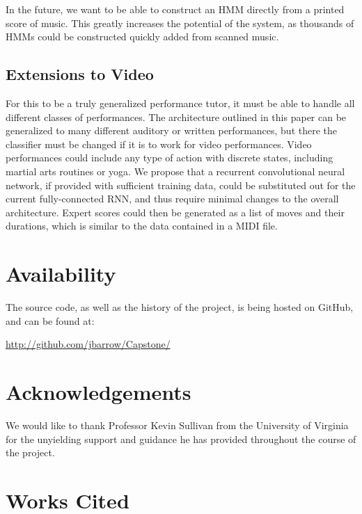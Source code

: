 \documentclass[twocolumn]{article}
\begin{document}
In the future, we want to be able to construct an HMM directly from a printed score of music. This greatly increases the potential of the system, as thousands of HMMs could be constructed quickly added from scanned music. 

\subsection{Extensions to Video}

For this to be a truly generalized performance tutor, it must be able to handle all different classes of performances. The architecture outlined in this paper can be generalized to many different auditory or written performances, but there the classifier must be changed if it is to work for video performances. Video performances could include any type of action with discrete states, including martial arts routines or yoga. We propose that a recurrent convolutional neural network, if provided with sufficient training data, could be substituted out for the current fully-connected RNN, and thus require minimal changes to the overall architecture. Expert scores could then be generated as a list of moves and their durations, which is similar to the data contained in a MIDI file.


\section{Availability}

The source code, as well as the history of the project, is being hosted on GitHub, and can be found at:
\begin{center}
\url{http://github.com/jbarrow/Capstone/}
\end{center}

\section{Acknowledgements}

We would like to thank Professor Kevin Sullivan from the University of Virginia for the unyielding support and guidance he has provided throughout the course of the project.

\section{Works Cited}

{}

\end{document}
